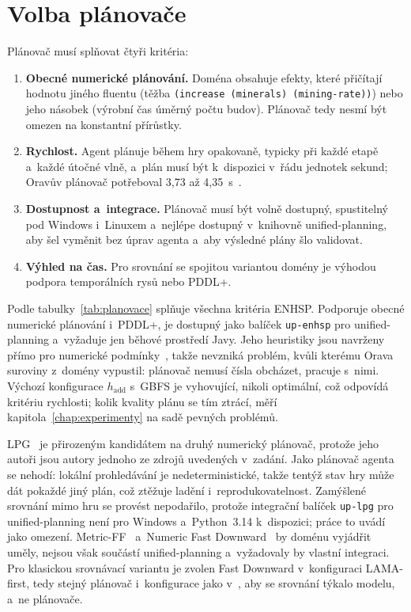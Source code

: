 \section{Volba plánovače}
\label{sec:volba}

Plánovač musí splňovat čtyři kritéria:
\begin{enumerate}
	\item \textbf{Obecné numerické plánování.} Doména obsahuje efekty, které přičítají hodnotu jiného fluentu (těžba \texttt{(increase (minerals) (mining-rate))}) nebo jeho násobek (výrobní čas úměrný počtu budov). Plánovač tedy nesmí být omezen na konstantní přírůstky.
	\item \textbf{Rychlost.} Agent plánuje během hry opakovaně, typicky při každé etapě a~každé útočné vlně, a~plán musí být k~dispozici v~řádu jednotek sekund; Oravův plánovač potřeboval 3,73 až 4,35~s~\cite{Orava2025}.
	\item \textbf{Dostupnost a~integrace.} Plánovač musí být volně dostupný, spustitelný pod Windows i~Linuxem a~nejlépe dostupný v~knihovně unified-planning, aby šel vyměnit bez úprav agenta a~aby výsledné plány šlo validovat.
	\item \textbf{Výhled na čas.} Pro srovnání se spojitou variantou domény je výhodou podpora temporálních rysů nebo PDDL+.
\end{enumerate}

Podle tabulky~\ref{tab:planovace} splňuje všechna kritéria ENHSP. Podporuje obecné numerické plánování i~PDDL+, je dostupný jako balíček \texttt{up-enhsp} pro unified-planning a~vyžaduje jen běhové prostředí Javy. Jeho heuristiky jsou navrženy přímo pro numerické podmínky~\cite{Scala2016,Scala2020}, takže nevzniká problém, kvůli kterému Orava suroviny z~domény vypustil: plánovač nemusí čísla obcházet, pracuje s~nimi. Výchozí konfigurace $h_{\mathrm{add}}$ s~GBFS je vyhovující, nikoli optimální, což odpovídá kritériu rychlosti; kolik kvality plánu se tím ztrácí, měří kapitola~\ref{chap:experimenty} na sadě pevných problémů.

LPG~\cite{Gerevini2003,Gerevini2008} je přirozeným kandidátem na druhý numerický plánovač, protože jeho autoři jsou autory jednoho ze zdrojů uvedených v~zadání. Jako plánovač agenta se nehodí: lokální prohledávání je nedeterministické, takže tentýž stav hry může dát pokaždé jiný plán, což ztěžuje ladění i~reprodukovatelnost. Zamýšlené srovnání mimo hru se provést nepodařilo, protože integrační balíček \texttt{up-lpg} pro unified-planning není pro Windows a~Python~3.14 k~dispozici; práce to uvádí jako omezení. Metric-FF~\cite{Hoffmann2003} a~Numeric Fast Downward~\cite{Aldinger2017} by doménu vyjádřit uměly, nejsou však součástí unified-planning a~vyžadovaly by vlastní integraci. Pro klasickou srovnávací variantu je zvolen Fast Downward v~konfiguraci LAMA-first, tedy stejný plánovač i~konfigurace jako v~\cite{Orava2025}, aby se srovnání týkalo modelu, a~ne plánovače.
